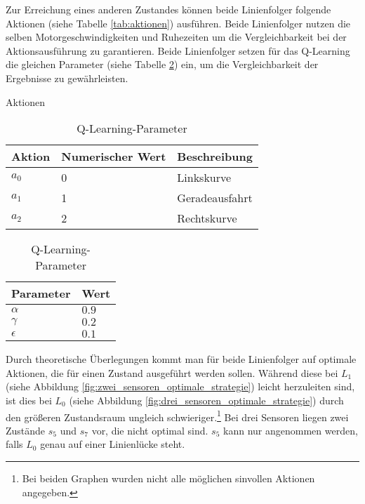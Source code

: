 Zur Erreichung eines anderen Zustandes können beide Linienfolger folgende Aktionen (siehe Tabelle \ref{tab:aktionen}) ausführen. Beide Linienfolger nutzen die selben Motorgeschwindigkeiten und Ruhezeiten um die Vergleichbarkeit bei der Aktionsausführung zu garantieren. Beide Linienfolger setzen für das Q-Learning die gleichen Parameter (siehe Tabelle \ref{tab:q-parameter}) ein, um die Vergleichbarkeit der Ergebnisse zu gewährleisten.

\begin{table}
\centering

\begin{minipage}{.4\textwidth}
\caption{Aktionen}
  \label{tab:aktionen}
  \renewcommand{\arraystretch}{1.2}
  \centering
  \sffamily
  \begin{footnotesize}
    \begin{tabular}{l l l}
    \toprule
    \textbf{Aktion} & \textbf{Numerischer Wert} & \textbf{Beschreibung}\\
    \midrule
    $a_0$ & 0 & Linkskurve\\
    $a_1$ & 1 & Ge­ra­de­aus­fahrt\\
    $a_2$ & 2 & Rechtskurve\\
    \bottomrule
    \end{tabular}
  \end{footnotesize}
  \rmfamily
\end{minipage}\hfill
\begin{minipage}{.4\textwidth}
\caption{Q-Learning-Parameter}
  \label{tab:q-parameter}
  \renewcommand{\arraystretch}{1.2}
  \centering
  \sffamily
  \begin{footnotesize}
    \begin{tabular}{l l}
    \toprule
    \textbf{Parameter} & \textbf{Wert}\\
    \midrule
    $\alpha$  & $0.9$\\
    $\gamma$  & $0.2$\\
    $\epsilon$  & $0.1$\\
    \bottomrule
    \end{tabular}
  \end{footnotesize}
  \rmfamily
\end{minipage}\hfill

\end{table}

Durch theoretische Überlegungen kommt man für beide Linienfolger auf optimale Aktionen, die für einen Zustand ausgeführt werden sollen. Während diese bei $L_1$ (siehe Abbildung \ref{fig:zwei_sensoren_optimale_strategie}) leicht herzuleiten sind, ist dies bei $L_0$ (siehe Abbildung \ref{fig:drei_sensoren_optimale_strategie}) durch den größeren Zustandsraum ungleich schwieriger.\footnote{Bei beiden Graphen wurden nicht alle möglichen sinvollen Aktionen angegeben.} Bei drei Sensoren liegen zwei Zustände $s_5$ und $s_7$ vor, die nicht optimal sind. $s_5$ kann nur angenommen werden, falls $L_0$ genau auf einer Linienlücke steht.

